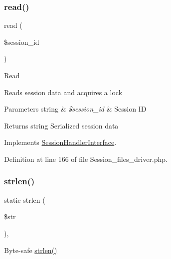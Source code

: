 \mbox{\label{class_c_i___session__files__driver_a5bbf84ebf657be4eaccc0582377c76bf}} 
\subsubsection{\texorpdfstring{read()}{read()}}
{\footnotesize\ttfamily read (\begin{DoxyParamCaption}\item[{}]{\$session\+\_\+id }\end{DoxyParamCaption})}

Read

Reads session data and acquires a lock


\begin{DoxyParams}[1]{Parameters}
string & {\em \$session\+\_\+id} & Session ID \\
\hline
\end{DoxyParams}
\begin{DoxyReturn}{Returns}
string Serialized session data 
\end{DoxyReturn}


Implements \mbox{\hyperlink{interface_session_handler_interface_a5bbf84ebf657be4eaccc0582377c76bf}{Session\+Handler\+Interface}}.



Definition at line 166 of file Session\+\_\+files\+\_\+driver.\+php.

\mbox{\label{class_c_i___session__files__driver_a4c29a687d4ed62c26a10e41d98930d5f}} 
\subsubsection{\texorpdfstring{strlen()}{strlen()}}
{\footnotesize\ttfamily static strlen (\begin{DoxyParamCaption}\item[{}]{\$str }\end{DoxyParamCaption})\hspace{0.3cm}{\ttfamily [static]}, {\ttfamily [protected]}}

Byte-\/safe \mbox{\hyperlink{class_c_i___session__files__driver_a4c29a687d4ed62c26a10e41d98930d5f}{strlen()}}


